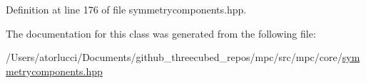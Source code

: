 Definition at line 176 of file symmetrycomponents.\+hpp.



The documentation for this class was generated from the following file\+:\begin{DoxyCompactItemize}
\item 
/\+Users/atorlucci/\+Documents/github\+\_\+threecubed\+\_\+repos/mpc/src/mpc/core/\mbox{\hyperlink{symmetrycomponents_8hpp}{symmetrycomponents.\+hpp}}\end{DoxyCompactItemize}
